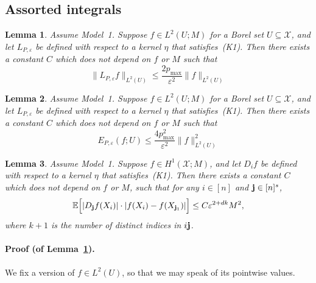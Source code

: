 \documentclass[aos]{imsart}
\theoremstyle{plain}
\newtheorem{lemma}{Lemma}
\theoremstyle{definition}
\theoremstyle{remark}
\newcommand{\Ebb}{\mathbb{E}}
\newcommand{\mc}[1]{\mathcal{#1}}
\newcommand{\1}{\mathbf{1}}
\newcommand{\bj}{{\bf j}}
\begin{document}
\subsection{Assorted integrals}
\label{subsec:integrals}

\begin{lemma}
	\label{lem:l2estimate_nonlocal_laplacian}
	Assume Model~1. Suppose $f \in L^2(U;M)$ for a Borel set $U \subseteq \mc{X}$, and let $L_{P,\varepsilon}$ be defined with respect to a kernel $\eta$ that satisfies~(K1). Then there exists a constant $C$ which does not depend on $f$ or $M$ such that
	\begin{equation}
	\label{eqn:l2estimate_nonlocal_laplacian}
	\|L_{P,\varepsilon}f\|_{L^2(U)} \leq \frac{2 p_{\max}}{\varepsilon^2} \|f\|_{L^2(U)}
	\end{equation}
\end{lemma}

\begin{lemma}
	\label{lem:dirichlet_estimate_nonlocal_laplacian}
	Assume Model~1. Suppose $f \in L^2(U;M)$ for a Borel set $U \subseteq \mc{X}$, and let $L_{P,\varepsilon}$ be defined with respect to a kernel $\eta$ that satisfies~(K1). Then there exists a constant $C$ which does not depend on $f$ or $M$ such that
	\begin{equation}
	\label{eqn:dirichlet_estimate_nonlocal_laplacian}
	E_{P,\varepsilon}(f;U) \leq \frac{4 p_{\max}^2}{\varepsilon^2} \|f\|_{L^2(U)}^2
	\end{equation}
\end{lemma}

\begin{lemma}
	\label{lem:graph_seminorm_bias2}
	Assume Model~1. Suppose $f \in H^1(\mc{X};M)$, and let $D_if$ be defined with respect to a kernel $\eta$ that satisfies~(K1). Then there exists a constant $C$ which does not depend on $f$ or $M$, such that for any $i \in [n]$ and $\bj \in [n]^s$,
	\begin{equation*}
	\Ebb\Bigl[|D_{\bj}f(X_i)| \cdot |f(X_i) - f(X_{\bj_1})|\Bigr] \leq C \varepsilon^{2 + dk}M^2,
	\end{equation*}
	where $k + 1$ is the number of distinct indices in $i\bj$. 
\end{lemma}

\paragraph{Proof (of Lemma~\ref{lem:l2estimate_nonlocal_laplacian}).}
We fix a version of $f \in L^2(U)$, so that we may speak of its pointwise values.
\end{document}
